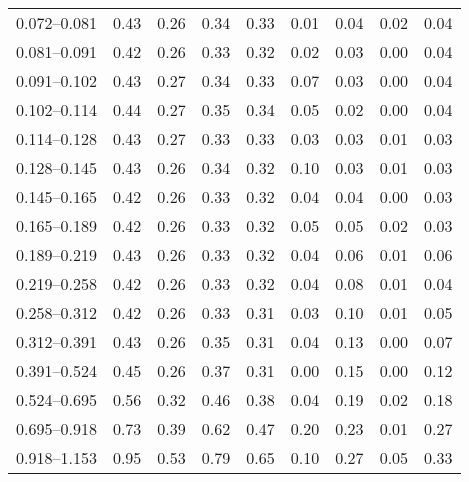 \begin{table}
\begin{center}
\begin{tabular}{@{}l l l l l l l l l@{}}
            0.072--0.081    &  0.43   &  0.26   &  0.34         &  0.33      &  0.01    &  0.04  &  0.02       &  0.04  \\
            0.081--0.091    &  0.42   &  0.26   &  0.33         &  0.32      &  0.02    &  0.03  &  0.00       &  0.04  \\
            0.091--0.102    &  0.43   &  0.27   &  0.34         &  0.33      &  0.07    &  0.03  &  0.00       &  0.04  \\
            0.102--0.114    &  0.44   &  0.27   &  0.35         &  0.34      &  0.05    &  0.02  &  0.00       &  0.04  \\
            0.114--0.128    &  0.43   &  0.27   &  0.33         &  0.33      &  0.03    &  0.03  &  0.01       &  0.03  \\
            0.128--0.145    &  0.43   &  0.26   &  0.34         &  0.32      &  0.10    &  0.03  &  0.01       &  0.03  \\
            0.145--0.165    &  0.42   &  0.26   &  0.33         &  0.32      &  0.04    &  0.04  &  0.00       &  0.03  \\
            0.165--0.189    &  0.42   &  0.26   &  0.33         &  0.32      &  0.05    &  0.05  &  0.02       &  0.03  \\
            0.189--0.219    &  0.43   &  0.26   &  0.33         &  0.32      &  0.04    &  0.06  &  0.01       &  0.06  \\
            0.219--0.258    &  0.42   &  0.26   &  0.33         &  0.32      &  0.04    &  0.08  &  0.01       &  0.04  \\
            0.258--0.312    &  0.42   &  0.26   &  0.33         &  0.31      &  0.03    &  0.10  &  0.01       &  0.05  \\
            0.312--0.391    &  0.43   &  0.26   &  0.35         &  0.31      &  0.04    &  0.13  &  0.00       &  0.07  \\
            0.391--0.524    &  0.45   &  0.26   &  0.37         &  0.31      &  0.00    &  0.15  &  0.00       &  0.12  \\
            0.524--0.695    &  0.56   &  0.32   &  0.46         &  0.38      &  0.04    &  0.19  &  0.02       &  0.18  \\
            0.695--0.918    &  0.73   &  0.39   &  0.62         &  0.47      &  0.20    &  0.23  &  0.01       &  0.27  \\
            0.918--1.153    &  0.95   &  0.53   &  0.79         &  0.65      &  0.10    &  0.27  &  0.05       &  0.33  \\

\end{tabular}
\end{center}
\end{table}
